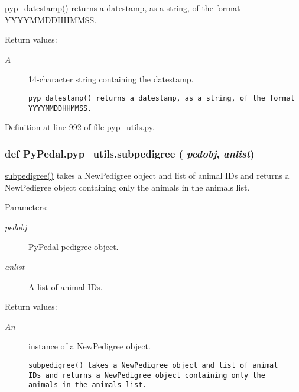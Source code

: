 \hyperlink{namespacePyPedal_1_1pyp__utils_bded02aaf1c6d3412cbdf3f3329b90cc}{pyp\_\-datestamp()} returns a datestamp, as a string, of the format YYYYMMDDHHMMSS. 

\begin{Desc}
\item[Return values:]
\begin{description}
\item[{\em A}]14-character string containing the datestamp.

\footnotesize\begin{verbatim}pyp_datestamp() returns a datestamp, as a string, of the format
YYYYMMDDHHMMSS.
\end{verbatim}
\normalsize
 \end{description}
\end{Desc}


Definition at line 992 of file pyp\_\-utils.py.\hypertarget{namespacePyPedal_1_1pyp__utils_5e35fcbb221870be99c0c9940f5a01de}{
\subsubsection[subpedigree]{\setlength{\rightskip}{0pt plus 5cm}def Py\-Pedal.pyp\_\-utils.subpedigree ( {\em pedobj},  {\em anlist})}}
\label{namespacePyPedal_1_1pyp__utils_5e35fcbb221870be99c0c9940f5a01de}


\hyperlink{namespacePyPedal_1_1pyp__utils_5e35fcbb221870be99c0c9940f5a01de}{subpedigree()} takes a New\-Pedigree object and list of animal IDs and returns a New\-Pedigree object containing only the animals in the animals list. 

\begin{Desc}
\item[Parameters:]
\begin{description}
\item[{\em pedobj}]Py\-Pedal pedigree object. \item[{\em anlist}]A list of animal IDs. \end{description}
\end{Desc}
\begin{Desc}
\item[Return values:]
\begin{description}
\item[{\em An}]instance of a New\-Pedigree object.

\footnotesize\begin{verbatim}subpedigree() takes a NewPedigree object and list of animal
IDs and returns a NewPedigree object containing only the
animals in the animals list.
\end{verbatim}
\normalsize
 \end{description}
\end{Desc}


